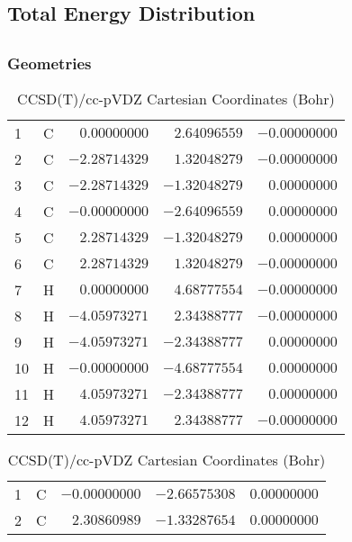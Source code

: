 \documentclass[10pt,oneside]{article}
\begin{document}
\begin{table}
\subsection*{Total Energy Distribution}
\centering\end{table}

\clearpage

\subsection{}

\begin{table}[h!]
\subsubsection*{Geometries}
\begin{multicols}{2}
\centering
\caption{CCSD(T)/cc-pVTZ Cartesian Coordinates (Bohr)}
\begin{tabular}{llrrr}
\toprule
1  & C  & $ 0.00000000$ & $ 2.64096559$ & $-0.00000000$ \\
2  & C  & $-2.28714329$ & $ 1.32048279$ & $-0.00000000$ \\
3  & C  & $-2.28714329$ & $-1.32048279$ & $ 0.00000000$ \\
4  & C  & $-0.00000000$ & $-2.64096559$ & $ 0.00000000$ \\
5  & C  & $ 2.28714329$ & $-1.32048279$ & $ 0.00000000$ \\
6  & C  & $ 2.28714329$ & $ 1.32048279$ & $-0.00000000$ \\
7  & H  & $ 0.00000000$ & $ 4.68777554$ & $-0.00000000$ \\
8  & H  & $-4.05973271$ & $ 2.34388777$ & $-0.00000000$ \\
9  & H  & $-4.05973271$ & $-2.34388777$ & $ 0.00000000$ \\
10 & H  & $-0.00000000$ & $-4.68777554$ & $ 0.00000000$ \\
11 & H  & $ 4.05973271$ & $-2.34388777$ & $ 0.00000000$ \\
12 & H  & $ 4.05973271$ & $ 2.34388777$ & $-0.00000000$ \\
\bottomrule
\end{tabular}
\caption{CCSD(T)/cc-pVDZ Cartesian Coordinates (Bohr)}
\begin{tabular}{llrrr}
\toprule
1  & C  & $-0.00000000$ & $-2.66575308$ & $ 0.00000000$ \\
2  & C  & $ 2.30860989$ & $-1.33287654$ & $ 0.00000000$ \\

\end{tabular}
\end{multicols}
\end{table}
\end{document}
